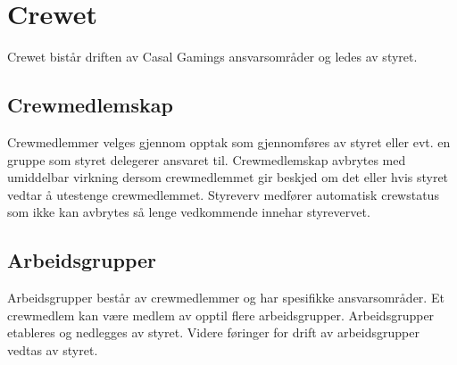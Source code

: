\chapter{Crewet}
Crewet bistår driften av Casal Gamings ansvarsområder og ledes av styret.

\section{Crewmedlemskap}
Crewmedlemmer velges gjennom opptak som gjennomføres av styret eller evt. en gruppe som styret delegerer ansvaret til. Crewmedlemskap avbrytes med umiddelbar virkning dersom crewmedlemmet gir beskjed om det eller hvis styret vedtar å utestenge crewmedlemmet. Styreverv medfører automatisk crewstatus som ikke kan avbrytes så lenge vedkommende innehar styrevervet.

\section{Arbeidsgrupper}
Arbeidsgrupper består av crewmedlemmer og har spesifikke ansvarsområder. Et crewmedlem kan være medlem av opptil flere arbeidsgrupper. Arbeidsgrupper etableres og nedlegges av styret. Videre føringer for drift av arbeidsgrupper vedtas av styret.

